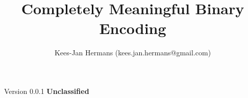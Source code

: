 \documentclass[twoside,a4paper]{refart}
\title{Completely Meaningful Binary Encoding}
\begin{document}
\maketitle

\begin{flushright}
\author{Kees-Jan Hermans (kees.jan.hermans@gmail.com)}
\date{}
\end{flushright}



\vfill
\begin{flushright}
Version 0.0.1
\textbf{Unclassified}

\end{flushright}

\newpage
\tableofcontents

\raggedbottom

\newpage




\printindex
\end{document}
